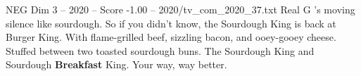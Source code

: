 \begin{textsample}{NEG Dim 3 – 2020 – Score -1.00 – 2020/tv\_com\_2020\_37.txt}  \label{ex:f3_neg_035}
Real G 's moving silence like sourdough.
So if you didn't know, the Sourdough King is back at Burger King.
With flame-grilled beef, sizzling bacon, and ooey-gooey cheese.
Stuffed between two toasted sourdough buns.
The Sourdough King and Sourdough \textbf{Breakfast} King.
Your way, way better.

\end{textsample}
